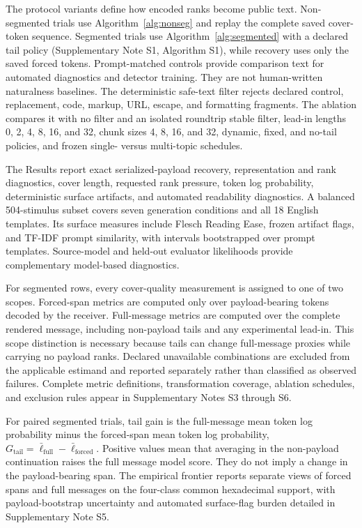 \documentclass[fleqn,10pt]{wlscirep}
\begin{document}
The protocol variants define how encoded ranks become public text. Non-segmented trials use Algorithm~\ref{alg:nonseg} and replay the complete saved cover-token sequence. Segmented trials use Algorithm~\ref{alg:segmented} with a declared tail policy (Supplementary Note S1, Algorithm S1), while recovery uses only the saved forced tokens. Prompt-matched controls provide comparison text for automated diagnostics and detector training. They are not human-written naturalness baselines. The deterministic safe-text filter rejects declared control, replacement, code, markup, URL, escape, and formatting fragments. The ablation compares it with no filter and an isolated roundtrip stable filter, lead-in lengths 0, 2, 4, 8, 16, and 32, chunk sizes 4, 8, 16, and 32, dynamic, fixed, and no-tail policies, and frozen single- versus multi-topic schedules.

The Results report exact serialized-payload recovery, representation and rank diagnostics, cover length, requested rank pressure, token log probability, deterministic surface artifacts, and automated readability diagnostics. A balanced 504-stimulus subset covers seven generation conditions and all 18 English templates. Its surface measures include Flesch Reading Ease\cite{Flesch1948Readability}, frozen artifact flags, and TF-IDF prompt similarity, with intervals bootstrapped over prompt templates. Source-model and held-out evaluator likelihoods provide complementary model-based diagnostics.

For segmented rows, every cover-quality measurement is assigned to one of two scopes. Forced-span metrics are computed only over payload-bearing tokens decoded by the receiver. Full-message metrics are computed over the complete rendered message, including non-payload tails and any experimental lead-in. This scope distinction is necessary because tails can change full-message proxies while carrying no payload ranks. Declared unavailable combinations are excluded from the applicable estimand and reported separately rather than classified as observed failures. Complete metric definitions, transformation coverage, ablation schedules, and exclusion rules appear in Supplementary Notes S3 through S6.

For paired segmented trials, tail gain is the full-message mean token log probability minus the forced-span mean token log probability, \(G_{\mathrm{tail}}=\bar\ell_{\mathrm{full}}-\bar\ell_{\mathrm{forced}}\). Positive values mean that averaging in the non-payload continuation raises the full message model score. They do not imply a change in the payload-bearing span. The empirical frontier reports separate views of forced spans and full messages on the four-class common hexadecimal support, with payload-bootstrap uncertainty and automated surface-flag burden detailed in Supplementary Note S5.
\end{document}
